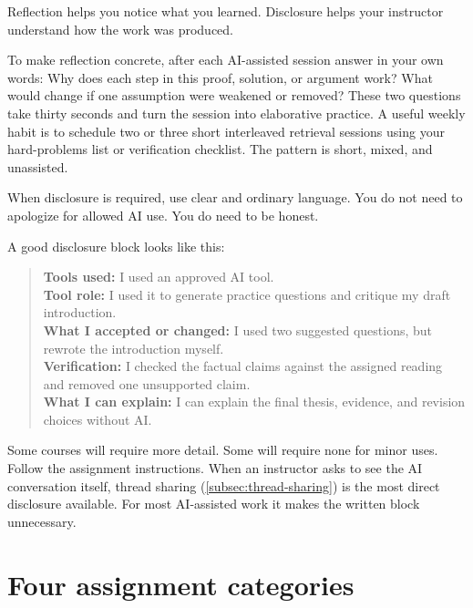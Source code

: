\documentclass{SIAMbook2023}
\begin{document}
Reflection helps you notice what you learned. Disclosure helps your instructor understand how the work was produced.

To make reflection concrete, after each AI-assisted session answer in your own words: Why does each step in this proof, solution, or argument work? What would change if one assumption were weakened or removed? These two questions take thirty seconds and turn the session into elaborative practice. A useful weekly habit is to schedule two or three short interleaved retrieval sessions using your hard-problems list or verification checklist. The pattern is short, mixed, and unassisted.

When disclosure is required, use clear and ordinary language. You do not need to apologize for allowed AI use. You do need to be honest.

A good disclosure block looks like this:

\begin{quote}
\textbf{Tools used:} I used an approved AI tool.\\
\textbf{Tool role:} I used it to generate practice questions and critique my draft introduction.\\
\textbf{What I accepted or changed:} I used two suggested questions, but rewrote the introduction myself.\\
\textbf{Verification:} I checked the factual claims against the assigned reading and removed one unsupported claim.\\
\textbf{What I can explain:} I can explain the final thesis, evidence, and revision choices without AI.
\end{quote}

Some courses will require more detail. Some will require none for minor uses. Follow the assignment instructions. When an instructor asks to see the AI conversation itself, thread sharing (\cref{subsec:thread-sharing}) is the most direct disclosure available. For most AI-assisted work it makes the written block unnecessary.

\section{Four assignment categories}
\label{sec:assignment-categories}%
\end{document}
